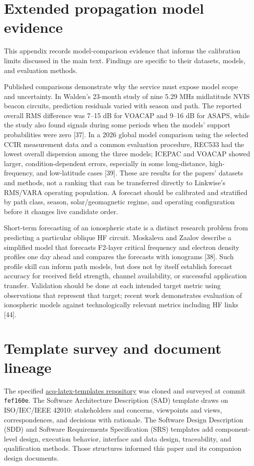 \documentclass[11pt,a4paper]{article}
\newcommand{\urlref}[2]{\href{#1}{#2}}
\begin{document}
\appendix


\section{Extended propagation model evidence}\label{app:model-evidence}
This appendix records model-comparison evidence that informs the
calibration limits discussed in the main text. Findings are specific
to their datasets, models, and evaluation methods.

Published comparisons demonstrate why the service must expose model scope and
uncertainty. In Walden's 23-month study of nine 5.29 MHz midlatitude NVIS
beacon circuits, prediction residuals varied with season and path. The
reported overall RMS difference was 7--15 dB for VOACAP and 9--16 dB for
ASAPS, while the study also found signals during some periods when the
models' support probabilities were zero [37]. In a 2026 global model
comparison using the selected CCIR measurement data and a common evaluation
procedure, REC533 had the lowest overall dispersion among the three models;
ICEPAC and VOACAP showed larger, condition-dependent errors, especially in
some long-distance, high-frequency, and low-latitude cases [39]. These are
results for the papers' datasets and methods, not a ranking that can be
transferred directly to Linkwise's RMS/VARA operating population. A forecast
should be calibrated and stratified by path class, season, solar/geomagnetic
regime, and operating configuration before it changes live candidate order.

Short-term forecasting of an ionospheric state is a distinct research problem
from predicting a particular oblique HF circuit. Moskaleva and Zaalov describe
a simplified model that forecasts F2-layer critical frequency and electron
density profiles one day ahead and compares the forecasts with ionograms [38].
Such profile skill can inform path models, but does not by itself establish
forecast accuracy for received field strength, channel availability, or
successful application transfer. Validation should be done at each intended
target metric using observations that represent that target; recent work
demonstrates evaluation of ionospheric models against technologically
relevant metrics including HF links [44].


\section{Template survey and document lineage}
The specified \urlref{https://github.com/8r4n/acq-latex-templates}{acq-latex-templates repository} was cloned and surveyed at commit \texttt{fef160e}. The Software Architecture Description (SAD) template draws on ISO/IEC/IEEE 42010: stakeholders and concerns, viewpoints and views, correspondences, and decisions with rationale. The Software Design Description (SDD) and Software Requirements Specification (SRS) templates add component-level design, execution behavior, interface and data design, traceability, and qualification methods. Those structures informed this paper and its companion design documents.
\end{document}
